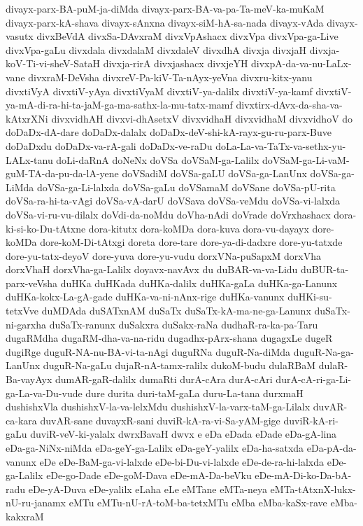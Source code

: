 {divayx-parx-BA-puM-ja-diMda
divayx-parx-BA-va-pa-Ta-meV-ka-muKaM
divayx-parx-kA-shava
divayx-sAnxna
divayx-siM-hA-sa-nada
divayx-vAda
divayx-vasutx
divxBeVdA
divxSa-DAvxraM
divxVpAshacx
divxVpa
divxVpa-ga-Live
divxVpa-gaLu
divxdala
divxdalaM
divxdaleV
divxdhA
divxja
divxjaH
divxja-koV-Ti-vi-sheV-SataH
divxja-rirA
divxjashacx
divxjeYH
divxpA-da-va-nu-LaLx-vane
divxraM-DeVsha
divxreV-Pa-kiV-Ta-nAyx-yeVna
divxru-kitx-yanu
divxtiVyA
divxtiV-yAya
divxtiVyaM
divxtiV-ya-dalilx
divxtiV-ya-kamf
divxtiV-ya-mA-di-ra-hi-ta-jaM-ga-ma-sathx-la-mu-tatx-mamf
divxtirx-dAvx-da-sha-va-kAtxrXNi
divxvidhAH
divxvi-dhAsetxV
divxvidhaH
divxvidhaM
divxvidhoV
do
doDaDx-dA-dare
doDaDx-dalalx
doDaDx-deV-shi-kA-rayx-gu-ru-parx-Buve
doDaDxdu
doDaDx-va-rA-gali
doDaDx-ve-raDu
doLa-La-va-TaTx-va-sethx-yu-LALx-tanu
doLi-daRnA
doNeNx
doVSa
doVSaM-ga-Lalilx
doVSaM-ga-Li-vaM-guM-TA-da-pu-da-lA-yene
doVSadiM
doVSa-gaLU
doVSa-ga-LanUnx
doVSa-ga-LiMda
doVSa-ga-Li-lalxda
doVSa-gaLu
doVSamaM
doVSane
doVSa-pU-rita
doVSa-ra-hi-ta-vAgi
doVSa-vA-darU
doVSava
doVSa-veMdu
doVSa-vi-lalxda
doVSa-vi-ru-vu-dilalx
doVdi-da-noMdu
doVha-nAdi
doVrade
doVrxhashacx
dora-ki-si-ko-Du-tAtxne
dora-kitutx
dora-koMDa
dora-kuva
dora-vu-dayayx
dore-koMDa
dore-koM-Di-tAtxgi
doreta
dore-tare
dore-ya-di-dadxre
dore-yu-tatxde
dore-yu-tatx-deyoV
dore-yuva
dore-yu-vudu
dorxVNa-puSapxM
dorxVha
dorxVhaH
dorxVha-ga-Lalilx
doyavx-navAvx
du
duBAR-va-va-Lidu
duBUR-ta-parx-veVsha
duHKa
duHKada
duHKa-dalilx
duHKa-gaLa
duHKa-ga-Lanunx
duHKa-kokx-La-gA-gade
duHKa-va-ni-nAnx-rige
duHKa-vanunx
duHKi-su-tetxVve
duMDAda
duSATxnAM
duSaTx
duSaTx-kA-ma-ne-ga-Lanunx
duSaTx-ni-garxha
duSaTx-ranunx
duSakxra
duSakx-raNa
dudhaR-ra-ka-pa-Taru
dugaRMdha
dugaRM-dha-va-na-ridu
dugadhx-pArx-shana
dugagxLe
dugeR
dugiRge
duguR-NA-nu-BA-vi-ta-nAgi
duguRNa
duguR-Na-diMda
duguR-Na-ga-LanUnx
duguR-Na-gaLu
dujaR-nA-tamx-ralilx
dukoM-budu
dulaRBaM
dulaR-Ba-vayAyx
dumAR-gaR-dalilx
dumaRti
durA-cAra
durA-cAri
durA-cA-ri-ga-Li-ga-La-va-Du-vude
dure
durita
duri-taM-gaLa
duru-La-tana
durxmaH
dushishxVla
dushishxV-la-va-lelxMdu
dushishxV-la-varx-taM-ga-Lilalx
duvAR-ca-kara
duvAR-sane
duvayxR-sani
duviR-kA-ra-vi-Sa-yAM-gige
duviR-kA-ri-gaLu
duviR-veV-ki-yalalx
dwrxBavaH
dwvx
e
eDa
eDada
eDade
eDa-gA-lina
eDa-ga-NiNx-niMda
eDa-geY-ga-Lalilx
eDa-geY-yalilx
eDa-ha-satxda
eDa-pA-da-vanunx
eDe
eDe-BaM-ga-vi-lalxde
eDe-bi-Du-vi-lalxde
eDe-de-ra-hi-lalxda
eDe-ga-Lalilx
eDe-go-Dade
eDe-goM-Dava
eDe-mA-Da-beVku
eDe-mA-Di-ko-Da-bA-radu
eDe-yA-Duva
eDe-yalilx
eLaha
eLe
eMTane
eMTa-neya
eMTa-tAtxnX-lukx-nU-ru-janamx
eMTu
eMTu-nU-rA-toM-ba-tetxMTu
eMba
eMba-kaSx-rave
eMba-kakxraM
}
